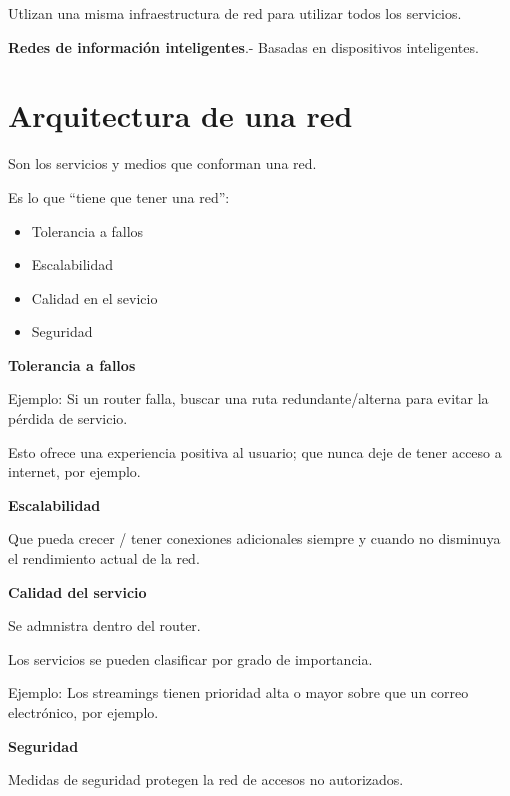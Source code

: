 \documentclass{article}
\begin{document}
Utlizan una misma infraestructura de red para utilizar todos los servicios.
\vspace{1em}

\textbf{Redes de información inteligentes}.- Basadas en dispositivos inteligentes.

\section{Arquitectura de una red}

Son los servicios y medios que conforman una red.
\vspace{1em}

Es lo que ``tiene que tener una red'':
\begin{itemize}
	\item
	Tolerancia a fallos
	\item
	Escalabilidad
	\item
	Calidad en el sevicio
	\item
	Seguridad
\end{itemize}
\vspace{1em}

\textbf{Tolerancia a fallos}
\vspace{1em}

Ejemplo: Si un router falla, buscar una ruta redundante/alterna
para evitar la pérdida de servicio.
\vspace{1em}

Esto ofrece una experiencia positiva al usuario; que nunca deje de tener
acceso a internet, por ejemplo.
\vspace{1em}

\textbf{Escalabilidad}

Que pueda crecer / tener conexiones adicionales siempre y cuando no disminuya
el rendimiento actual de la red.
\vspace{1em}

\textbf{Calidad del servicio}

Se admnistra dentro del router.
\vspace{1em}

Los servicios se pueden clasificar por grado de importancia.
\vspace{1em}

Ejemplo: Los streamings tienen prioridad alta o mayor sobre que un correo
electrónico, por ejemplo.
\vspace{1em}

\textbf{Seguridad}

Medidas de seguridad protegen la red de accesos no autorizados.
\vspace{1em}
\end{document}
